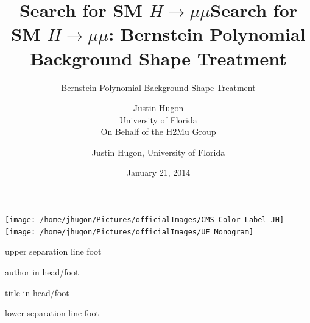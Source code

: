 \documentclass{beamer}
\title{Search for SM $H \rightarrow \mu \mu$}
\subtitle{Bernstein Polynomial Background Shape Treatment}
\date{January 21, 2014}
\author{Justin Hugon \\ University of Florida \vspace{0.5em} \\ On Behalf of the H2Mu Group}
\begin{document}
\begin{frame}
  \maketitle
\vspace{-1em}
  \texttt{[image: /home/jhugon/Pictures/officialImages/CMS-Color-Label-JH]}
  \hfill
  \texttt{[image: /home/jhugon/Pictures/officialImages/UF\_Monogram]}
\end{frame}

\makeatletter
{}
{
    \begin{beamercolorbox}[colsep=1.5pt]{upper separation line foot}
    \end{beamercolorbox}
    \begin{beamercolorbox}[ht=2.5ex,dp=1.125ex,%
      leftskip=.3cm,rightskip=.3cm plus1fil]{author in head/foot}%
      \hfill%
      {\insertshortinstitute}%
    \end{beamercolorbox}%
    \begin{beamercolorbox}[ht=2.5ex,dp=1.125ex,%
      leftskip=.3cm,rightskip=.3cm plus1fil]{title in head/foot}%
      {\insertshorttitle \hfill \insertframenumber}%
    \end{beamercolorbox}%
    \begin{beamercolorbox}[colsep=1.5pt]{lower separation line foot}
    \end{beamercolorbox}
}
\makeatother

\title{Search for SM $H \rightarrow \mu \mu$: Bernstein Polynomial Background Shape Treatment}
\author{Justin Hugon, University of Florida}
\end{document}
